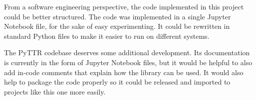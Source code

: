 From a software engineering perspective, the code implemented in this project could be better structured.
The code was implemented in a single Jupyter Notebook file, for the sake of easy experimenting.
It could be rewritten in standard Python files to make it easier to run on different systems.

The PyTTR codebase deserves some additional development.
Its documentation is currently in the form of Jupyter Notebook files, but it would be helpful to also add in-code comments that explain how the library can be used.
It would also help to package the code properly so it could be released and imported to projects like this one more easily.


